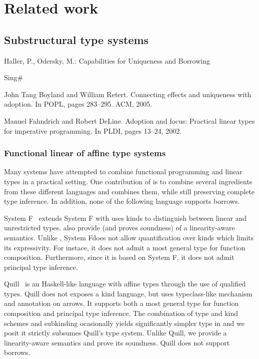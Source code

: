 \section{Related work}

\subsection{Substructural type systems}

Haller, P., Odersky, M.: Capabilities for Uniqueness and Borrowing
\cite{DBLP:conf/ecoop/HallerO10}

Sing\#

John Tang Boyland and William Retert. Connecting effects and
uniqueness with adoption. In POPL, pages 283–295. ACM, 2005.
\cite{DBLP:conf/popl/BoylandR05}

Manuel Fahndrich and Robert DeLine. Adoption and focus: Practical
linear types for imperative programming. In PLDI, pages 13–24, 2002.

\subsubsection{Functional linear of affine type systems}

Many systems have attempted to combine
functional programming and linear types in a practical setting.
One contribution of \lang is to combine several ingredients
from these different languages and combines them, while still preserving
complete type inference.
In addition, none of the following language supports borrows.

System F\degree~\citep{DBLP:conf/tldi/MazurakZZ10}
extends System F with uses kinds to distinguish
between linear and unrestricted types.
\citet{DBLP:conf/tldi/MazurakZZ10} also provide
(and proves soundness) of a linearity-aware semantics.
Unlike \lang, System F\degree does not allow
quantification over kinds which limits its expressivity. For instace, it
does not admit a most general type for function composition.
Furthermore, since it is based on System F, it does not admit
principal type inference.

Quill~\citep{DBLP:conf/icfp/Morris16} is an Haskell-like language with affine
types through the use of qualified types.
Quill does not exposes a kind language, but
uses typeclass-like mechanism and annotation on arrows.
It supports both a most general type for function composition and
principal type inference.
The combination of type and kind schemes
and subkinding ocasionally yields significantly simpler
type in \lang and we posit it strictly subsumes Quill's type system.
Unlike Quill,
we provide a linearity-aware semantics and prove its soundness.
Quill does not support borrows.

